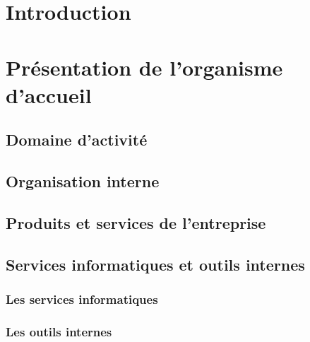 \section{Introduction}


\section{Présentation de l'organisme d'accueil}

\subsection{Domaine d'activité}


\subsection{Organisation interne}


\subsection{Produits et services de l'entreprise}


\subsection{Services informatiques et outils internes}

\subsubsection{Les services informatiques}


\subsubsection{Les outils internes}